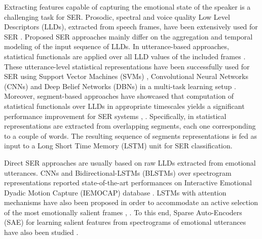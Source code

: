 \documentclass[a4paper]{article}
\begin{document}
Extracting features capable of capturing the emotional state of the speaker is a challenging task for SER. Prosodic, spectral and voice quality Low Level Descriptors (LLDs), extracted from speech frames, have been extensively used for SER \cite{el2011survey}. Proposed SER approaches mainly differ on the aggregation and temporal modeling of the input sequence of LLDs. 
In utterance-based approaches, statistical functionals are applied over all LLD values of the included frames \cite{schuller2010interspeech}. 
These utterance-level statistical representations have been successfully used for SER using Support Vector Machines (SVMs) \cite{shri2011SVM}, Convolutional Neural Networks (CNNs) \cite{emily2017regionalsaliency} and Deep Belief Networks (DBNs) in a multi-task learning setup \cite{xia2017multi}. 
Moreover, segment-based approaches have showcased that computation of statistical functionals over LLDs in appropriate timescales yields a significant performance improvement for SER systems \cite{schuller2006timing}, \cite{tzinis2017segment}. Specifically, in \cite{tzinis2017segment} statistical representations are extracted from overlapping segments, each one corresponding to a couple of words. The resulting sequence of segments representations is fed as input to a Long Short Time Memory (LSTM) unit for SER classification.

Direct SER approaches are usually based on raw LLDs extracted from emotional utterances. CNNs \cite{fayek2017stateoftheart} and Bidirectional-LSTMs (BLSTMs) \cite{ghosh2016representation} over spectrogram representations reported state-of-the-art performances on Interactive Emotional Dyadic Motion Capture (IEMOCAP) database \cite{IEMOCAP}. LSTMs with attention mechanisms have also been proposed in order to accommodate an active selection of the most emotionally salient frames \cite{shri2016attention}, \cite{mirsamadi2017attention}. To this end, Sparse Auto-Encoders (SAE) for learning salient features from  spectrograms of emotional utterances have also been studied \cite{mao2014autoencoder}.      
\end{document}
